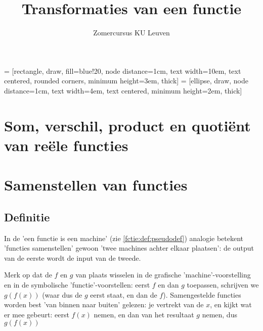 \documentclass{ximera}
\author{Zomercursus KU Leuven}
\title{Transformaties van een functie}
\begin{document}
\begin{abstract}

\end{abstract}
\maketitle  

 = [rectangle, draw, fill=blue!20, node distance=1cm, text width=10em, text centered, rounded corners, minimum height=3em, thick]
 = [ellipse, draw, node distance=1cm, text width=4em, text centered, minimum height=2em, thick]

\section{Som, verschil, product en quotiënt van reële functies}


\section{Samenstellen van functies}

\subsection{Definitie}
In de 'een functie is een machine' (zie \autoref{fctie:def:pseudodef}) analogie betekent 'functies samenstellen' gewoon 'twee machines achter elkaar plaatsen': de output van de eerste wordt de input van de tweede. 

\begin{center}
\end{center}

Merk op dat de $f$ en $g$ van plaats wisselen in de grafische 'machine'-voorstelling en in de symbolische 'functie'-voorstellen: eerst $f$ en dan $g$ toepassen, schrijven we $g(f(x))$ (waar dus de $g$ eerst staat, en dan de $f$). Samengestelde functies worden best 'van binnen naar buiten' gelezen: je vertrekt van de $x$, en kijkt wat er mee gebeurt: eerst $f(x)$ nemen, en dan van het resultaat $g$ nemen, dus $g(f(x))$ 
\end{document}

